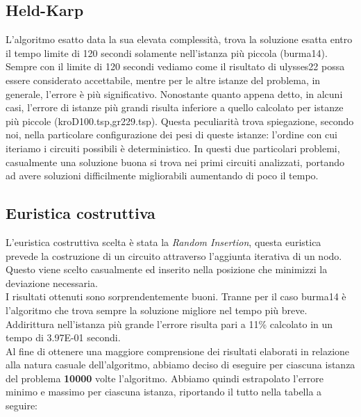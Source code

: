 \documentclass{article}
\begin{document}
\subsection*{Held-Karp}
L'algoritmo esatto data la sua elevata complessità, trova la soluzione esatta entro il tempo limite di 120 secondi solamente nell'istanza più piccola (burma14). Sempre con il limite di 120 secondi vediamo come il risultato di ulysses22 possa essere considerato accettabile, mentre per le altre istanze del problema, in generale, l'errore è più significativo. Nonostante quanto appena detto, in alcuni casi, l'errore di istanze più grandi risulta inferiore a quello calcolato per istanze più piccole (kroD100.tsp,gr229.tsp). Questa peculiarità trova spiegazione, secondo noi, nella particolare configurazione dei pesi di queste istanze: l'ordine con cui iteriamo i circuiti possibili è deterministico. In questi due particolari problemi, casualmente una soluzione buona si trova nei primi circuiti analizzati, portando ad avere soluzioni difficilmente migliorabili aumentando di poco il tempo.

\subsection*{Euristica costruttiva}
L'euristica costruttiva scelta è stata la \textit{Random Insertion}, questa euristica prevede la costruzione di un circuito attraverso l'aggiunta iterativa di un nodo. 
Questo viene scelto casualmente ed inserito nella posizione che minimizzi la deviazione necessaria.\\
I risultati ottenuti sono sorprendentemente buoni. Tranne per il caso burma14 è l'algoritmo che trova sempre la soluzione migliore nel tempo più breve. Addirittura nell'istanza più grande l'errore risulta pari a 11\% calcolato in un tempo di 3.97E-01 secondi.\\
Al fine di ottenere una maggiore comprensione dei risultati elaborati in relazione alla natura casuale dell'algoritmo, abbiamo deciso di eseguire per ciascuna istanza del problema \textbf{10000} volte l'algoritmo. Abbiamo quindi estrapolato l'errore minimo e massimo per ciascuna istanza, riportando il tutto nella tabella a seguire:\\ 
\end{document}
